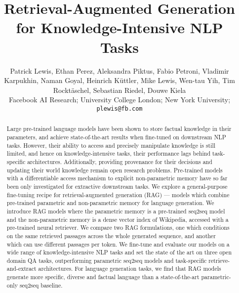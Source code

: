 \documentclass{article}
\title{Retrieval-Augmented Generation for Knowledge-Intensive NLP Tasks}
\author{Patrick Lewis, Ethan Perez,\And
  Aleksandra Piktus, Fabio Petroni, Vladimir Karpukhin, Naman Goyal, Heinrich K\"uttler,\And
  Mike Lewis, Wen-tau Yih, Tim Rockt\"aschel, Sebastian Riedel, Douwe Kiela\vspace{15pt}\\
Facebook AI Research; University College London; New York University;\vspace{2pt}\\
  \texttt{plewis@fb.com}\\
}
\begin{document}
\maketitle

\begin{abstract}

Large pre-trained language models have been shown to store factual knowledge in their parameters, and achieve state-of-the-art results when fine-tuned on downstream NLP tasks.
However, their ability to access and precisely manipulate knowledge is still limited, and hence on knowledge-intensive tasks, their performance lags behind task-specific architectures.
Additionally, providing provenance for their decisions and updating their world knowledge remain open research problems.
Pre-trained models with a differentiable access mechanism to explicit non-parametric memory
have so far been only investigated for extractive downstream tasks.
We explore a general-purpose fine-tuning recipe for retrieval-augmented generation (RAG)  --- models which combine pre-trained parametric and non-parametric memory for language generation. 
We introduce RAG models where the parametric memory is a pre-trained seq2seq model and the non-parametric memory is a dense vector index of Wikipedia, accessed with a pre-trained neural retriever. 
We compare two RAG formulations, one which conditions on the same retrieved passages across the whole generated sequence, and another which can use different passages per token.
We fine-tune and evaluate our models on a wide range of knowledge-intensive NLP tasks and set the state of the art on three open domain QA tasks, outperforming parametric seq2seq models and task-specific retrieve-and-extract architectures.  
For language generation tasks, we find that RAG models generate more specific, diverse and factual language than a state-of-the-art parametric-only seq2seq baseline. 
%
 \end{abstract}
\end{document}
